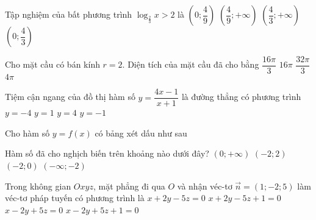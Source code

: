 \begin{ex}%
	Tập nghiệm của bất phương trình $\log _{\frac{2}{3}}x>2$ là
	\choice
	{\True $\left(0 ; \dfrac{4}{9}\right)$}
	{$\left(\dfrac{4}{9};+\infty\right)$}
	{$\left(\dfrac{4}{3};+\infty\right)$}
	{$\left(0 ; \dfrac{4}{3}\right)$}
\end{ex}
\begin{ex}%
	Cho mặt cầu có bán kính $r=2$. Diện tích của mặt cầu đã cho bằng
	\choice
	{$\dfrac{16 \pi}{3}$}
	{\True $16 \pi$}
	{$\dfrac{32 \pi}{3}$}
	{$4 \pi$}
\end{ex}
\begin{ex}%
	Tiệm cận ngang của đồ thị hàm số $y=\dfrac{4 x-1}{x+1}$ là đường thẳng có phương trình
	\choice
	{$y=-4$}
	{$y=1$}
	{\True $y=4$}
	{$y=-1$}
\end{ex}
\begin{ex}%
	Cho hàm số $y=f(x)$ có bảng xét dấu như sau
	\begin{center}
	\end{center}
	Hàm số đã cho nghịch biến trên khoảng nào dưới đây?
	\choice
	{$(0;+\infty)$}
	{$(-2;2)$}
	{\True $(-2;0)$}
	{$(-\infty;-2)$}
\end{ex}

\begin{ex}%
	Trong không gian $Oxyz$, mặt phẳng đi qua $O$ và nhận véc-tơ $\vec{n}=(1;-2;5)$ làm véc-tơ pháp tuyến có phương trình là
	\choice
	{$x+2y-5z=0$}
	{$x+2y-5z+1=0$}
	{\True $x-2y+5z=0$}
	{$x-2y+5z+1=0$}
\end{ex}

